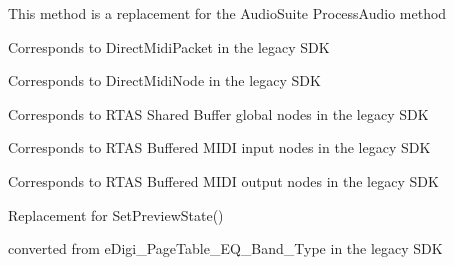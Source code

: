 \begin{DoxyRefList}
%
 This method is a replacement for the Audio\+Suite {\ttfamily Process\+Audio} method 
\item[Class \mbox{\hyperlink{a01429}{A\+A\+X\+\_\+\+C\+Midi\+Packet}} ]\label{a00787__porting_notes000003}%
%
 Corresponds to Direct\+Midi\+Packet in the legacy S\+DK  
\item[Class \mbox{\hyperlink{a01433}{A\+A\+X\+\_\+\+C\+Midi\+Stream}} ]\label{a00787__porting_notes000004}%
%
 Corresponds to Direct\+Midi\+Node in the legacy S\+DK  
\item[Member \mbox{\hyperlink{a00491_a5e1dffce35d05990dbbad651702678e4a2be91828f8c1dac20ab5dff136fc1fce}{A\+A\+X\+\_\+e\+M\+I\+D\+I\+Node\+Type\+\_\+\+Global}} ]\label{a00787__porting_notes000029}%
%
 Corresponds to R\+T\+AS Shared Buffer global nodes in the legacy S\+DK  
\item[Member \mbox{\hyperlink{a00491_a5e1dffce35d05990dbbad651702678e4ae57de2b04978fe2e75f5bdeb034bda44}{A\+A\+X\+\_\+e\+M\+I\+D\+I\+Node\+Type\+\_\+\+Local\+Input}} ]\label{a00787__porting_notes000027}%
%
 Corresponds to R\+T\+AS Buffered M\+I\+DI input nodes in the legacy S\+DK  
\item[Member \mbox{\hyperlink{a00491_a5e1dffce35d05990dbbad651702678e4acc1b5f2109c508b20a65b5e0fdcd643f}{A\+A\+X\+\_\+e\+M\+I\+D\+I\+Node\+Type\+\_\+\+Local\+Output}} ]\label{a00787__porting_notes000028}%
%
 Corresponds to R\+T\+AS Buffered M\+I\+DI output nodes in the legacy S\+DK  
\item[Member \mbox{\hyperlink{a00491_afab5ea2cfd731fc8f163b6caa685406ea8ca3f7d5e93eecf945682f6fc55f5263}{A\+A\+X\+\_\+e\+Notification\+Event\+\_\+\+A\+S\+Preview\+State}} ]\label{a00787__porting_notes000021}%
%
 Replacement for {\ttfamily Set\+Preview\+State()}  
\item[Member \mbox{\hyperlink{a00491_aa169208a2ce713fa021e20deb2eaf608a99ca84cc3dae0f125082d36893a12bcd}{A\+A\+X\+\_\+e\+Page\+Table\+\_\+\+E\+Q\+\_\+\+Band\+\_\+\+Type}} ]\label{a00787__porting_notes000024}%
%
 converted from {\ttfamily e\+Digi\+\_\+\+Page\+Table\+\_\+\+E\+Q\+\_\+\+Band\+\_\+\+Type} in the legacy S\+DK 
\item[Member \mbox{\hyperlink{a00491_aa169208a2ce713fa021e20deb2eaf608ac5a06a293b7706191d3371813c47e999}{A\+A\+X\+\_\+e\+Page\+Table\+\_\+\+E\+Q\+\_\+\+In\+Circuit\+Polarity}} ]\label{a00787__porting_notes000025}%

\end{DoxyRefList}
